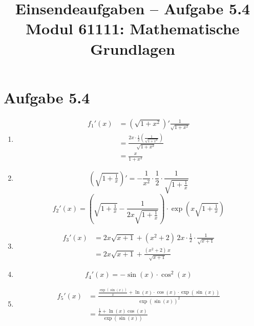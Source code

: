 \documentclass[a4paper,12pt]{article}
\title{Einsendeaufgaben -- Aufgabe 5.4\\[0.5em]
\large Modul 61111: Mathematische Grundlagen}
\author{}
\date{}
\begin{document}
\maketitle

\section*{Aufgabe 5.4}

\begin{enumerate}[label=\alph*)]
  \item
  \begin{align*}
    f_1'(x) &= \left(\sqrt{1+x^2}\right)' \frac{1}{\sqrt{1+x^2}} \\[0.5em]
            &= \frac{2x \cdot \frac{1}{2}\left(\frac{1}{\sqrt{1+x^2}}\right)}{\sqrt{1+x^2}} \\[0.5em]
            &= \frac{x}{1+x^2}
  \end{align*}

  \item
  \[
    \left(\sqrt{1+\tfrac{1}{x}}\right)' = -\frac{1}{x^2} \cdot \frac{1}{2} \cdot \frac{1}{\sqrt{1+\frac{1}{x}}}
  \]
  \[
    f_2'(x) = \left(\sqrt{1+\tfrac{1}{x}} - \frac{1}{2x\sqrt{1+\frac{1}{x}}}\right) \cdot \exp\!\left(x\sqrt{1+\tfrac{1}{x}}\right)
  \]

  \item
  \begin{align*}
    f_3'(x) &= 2x\sqrt{x+1} + (x^2+2)\, 2x \cdot \frac{1}{2} \cdot \frac{1}{\sqrt{x+1}} \\[0.5em]
            &= 2x\sqrt{x+1} + \frac{(x^2+2)\,x}{\sqrt{x+1}}
  \end{align*}

  \item
  \[
    f_4'(x) = -\sin(x)\cdot\cos^2(x)
  \]

  \item
  \begin{align*}
    f_5'(x) &= \frac{\frac{\exp(\sin(x))}{x} + \ln(x)\cdot\cos(x)\cdot\exp(\sin(x))}{\exp(\sin(x))^2} \\[0.8em]
            &= \frac{\frac{1}{x} + \ln(x)\cos(x)}{\exp(\sin(x))}
  \end{align*}
\end{enumerate}
\end{document}

